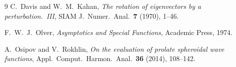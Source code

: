 \documentclass[11pt,a4paper]{article}
\begin{document}
\begin{thebibliography}{9}
  C.~Davis and W.~M.~Kahan,
  \textit{The rotation of eigenvectors by a perturbation.~III},
  SIAM J.\ Numer.\ Anal.\ \textbf{7} (1970), 1--46.

  F.~W.~J.~Olver,
  \textit{Asymptotics and Special Functions},
  Academic Press, 1974.

  A.~Osipov and V.~Rokhlin,
  \textit{On the evaluation of prolate spheroidal wave functions},
  Appl.\ Comput.\ Harmon.\ Anal.\ \textbf{36} (2014), 108--142.
\end{thebibliography}
\end{document}
